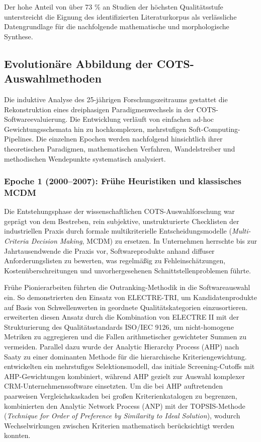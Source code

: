 Der hohe Anteil von über 73 \% an Studien der höchsten Qualitätsstufe unterstreicht die Eignung des identifizierten Literaturkorpus als verlässliche Datengrundlage für die nachfolgende mathematische und morphologische Synthese.

\subsection{Evolutionäre Abbildung der COTS-Auswahlmethoden}
\label{subsec:evolutionaere_abbildung}

Die induktive Analyse des 25-jährigen Forschungszeitraums gestattet die Rekonstruktion eines dreiphasigen Paradigmenwechsels in der COTS-Softwareevaluierung. Die Entwicklung verläuft von einfachen ad-hoc Gewichtungsschemata hin zu hochkomplexen, mehrstufigen Soft-Computing-Pipelines. Die einzelnen Epochen werden nachfolgend hinsichtlich ihrer theoretischen Paradigmen, mathematischen Verfahren, Wandelstreiber und methodischen Wendepunkte systematisch analysiert.

\subsubsection{Epoche 1 (2000--2007): Frühe Heuristiken und klassisches MCDM}

Die Entstehungsphase der wissenschaftlichen COTS-Auswahlforschung war geprägt von dem Bestreben, rein subjektive, unstrukturierte Checklisten der industriellen Praxis durch formale multikriterielle Entscheidungsmodelle (\textit{Multi-Criteria Decision Making}, MCDM) zu ersetzen. In Unternehmen herrschte bis zur Jahrtausendwende die Praxis vor, Softwareprodukte anhand diffuser Anforderungslisten zu bewerten, was regelmäßig zu Fehleinschätzungen, Kostenüberschreitungen und unvorhergesehenen Schnittstellenproblemen führte.

Frühe Pionierarbeiten führten die Outranking-Methodik in die Softwareauswahl ein. So demonstrierten \cite{LZQJ6M4X} den Einsatz von ELECTRE-TRI, um Kandidatenprodukte auf Basis von Schwellenwerten in geordnete Qualitätskategorien einzusortieren. \cite{M3B2D3GD} erweiterten diesen Ansatz durch die Kombination von ELECTRE II mit der Strukturierung des Qualitätsstandards ISO/IEC 9126, um nicht-homogene Metriken zu aggregieren und die Fallen arithmetischer gewichteter Summen zu vermeiden. Parallel dazu wurde der Analytic Hierarchy Process (AHP) nach Saaty zu einer dominanten Methode für die hierarchische Kriteriengewichtung. \cite{FCYW9EWJ} entwickelten ein mehrstufiges Selektionsmodell, das initiale Screening-Cutoffs mit AHP-Gewichtungen kombiniert, während \cite{DAU8NSK8} AHP gezielt zur Auswahl komplexer CRM-Unternehmenssoftware einsetzten. Um die bei AHP auftretenden paarweisen Vergleichskaskaden bei großen Kriterienkatalogen zu begrenzen, kombinierten \cite{U5JPV4SF} den Analytic Network Process (ANP) mit der TOPSIS-Methode (\textit{Technique for Order of Preference by Similarity to Ideal Solution}), wodurch Wechselwirkungen zwischen Kriterien mathematisch berücksichtigt werden konnten.

